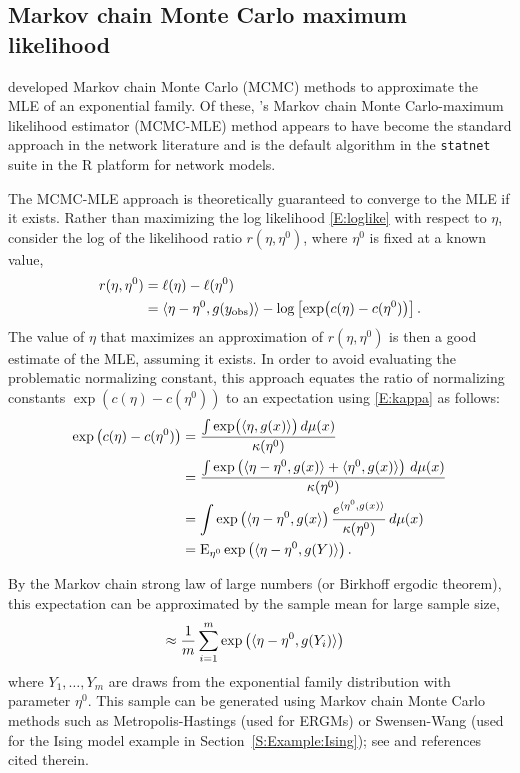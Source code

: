\subsection{Markov chain Monte Carlo maximum likelihood} \label{S:MCMC-MLE}
\citet{Geyer:1992, Corander:1998, Snijders:2002} developed Markov chain Monte Carlo 
(MCMC) methods to approximate the MLE of an exponential family.  Of these, \citeauthor
{Geyer:1992}'s Markov chain Monte Carlo-maximum likelihood estimator (MCMC-MLE) method 
appears to have become the standard approach in the network literature 
\citep{Hunter:2006, Handcock:2006, GOF} and is the default algorithm in 
the \texttt{statnet} suite \citep{statnet:R} in the R platform for network models.  

The MCMC-MLE approach is theoretically guaranteed to converge to the MLE if it exists.  
Rather than maximizing the log likelihood \eqref{E:loglike}
with respect to $\eta$, \citeauthor{Geyer:1992} consider 
the log of the likelihood ratio $r( \eta, \eta^0 )$, where $\eta^0$ 
is fixed at a known value,
\begin{align}
 r( \eta, \eta^0 ) &= \ell( \eta ) - \ell( \eta^0 ) \notag \\ 
				  &= \langle  \eta - \eta^0, g(y_{\text{obs}}) \rangle - \log \left [ \exp \bigl( c(\eta) - c(\eta^0) \bigr) \right ].\label{E:r}
\end{align}
The value of $\eta$ that maximizes an
approximation of $r( \eta, \eta^0 )$ is then a good estimate of the MLE, 
assuming it exists.  In order to avoid evaluating the problematic normalizing constant,
this approach equates the ratio of normalizing constants 
$\exp \left (  c(\eta) - c(\eta^0) \right )$ to an expectation 
using \eqref{E:kappa} as follows:
\begin{align*}
	\exp \left (  c(\eta) - c(\eta^0) \right ) &= \frac{ \int \exp \bigl ( \langle  \eta, g(x)  \rangle\bigr ) \, d\mu(x) }{ \kappa(\eta^0)  } \\
	&= \frac{ \int \exp \left ( \langle  \eta - \eta^0, g(x) \rangle + \langle  \eta^0, g(x) \rangle \right ) \, d\mu(x)  }{ \kappa(\eta^0) } \\
	&= \int \exp \left( \langle \eta - \eta^0, g(x \rangle \right ) \frac{ e^ { \langle  \eta^0, g(x) \rangle } }{ \kappa(\eta^0) } \, d\mu(x)\\
	&= \operatorname{E}_{\eta^0} \exp \left( \langle  \eta - \eta^0, g(Y) \rangle  \right ) .
\end{align*}

By the Markov chain strong law of large numbers (or Birkhoff ergodic theorem), this 
expectation can be approximated by the sample mean for large sample size,
\begin{align*}
	&\approx \frac{1}{m} \sum_{i=1}^{m}\exp \left ( \langle  \eta - \eta^0,g(Y_i) \rangle \right )
\end{align*}
where $Y_1, \ldots, Y_m$ are draws from the exponential family distribution with 
parameter $\eta^0$.  This sample can be generated using Markov chain Monte Carlo 
methods such as Metropolis-Hastings (used for ERGMs) or Swensen-Wang (used for the Ising model example in Section~\ref{S:Example:Ising}); see 
\citep{Brooks} and references cited therein.

